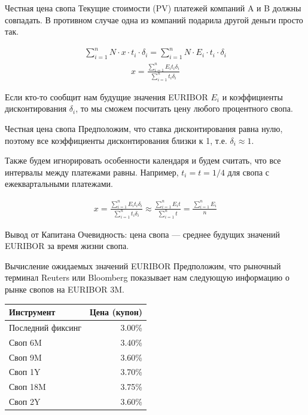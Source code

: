 \documentclass{beamer}
\begin{document}
\begin{frame}{Честная цена свопа}
\justify
Текущие стоимости (PV) платежей компаний A и B должны совпадать. В противном случае одна из компаний подарила другой деньги просто так.

\justify
\begin{align*}
\sum\limits_{i=1}^{n} N \cdot x \cdot t_i \cdot \delta_i 
= \sum\limits_{i=1}^{n} N \cdot E_i \cdot t_i \cdot \delta_i
\end{align*}
\begin{align*}
x = \frac{\sum\limits_{i=1}^{n} E_i t_i \delta_i}{\sum\limits_{i=1}^{n} t_i \delta_i}
\end{align*}

\justify
Если кто-то сообщит нам будущие значения EURIBOR $E_i$ и коэффициенты дисконтирования $\delta_i$, то мы сможем посчитать цену любого процентного свопа.
\end{frame}



\begin{frame}{Честная цена свопа}
\justify
Предположим, что ставка дисконтирования равна нулю, поэтому все коэффициенты дисконтирования близки к 1, т.е. $\delta_i \approx1$.

\justify
Также будем игнорировать особенности календаря и будем считать, что все интервалы между платежами равны. Например, $t_i = t = 1/4$ для свопа с ежеквартальными платежами.

\begin{align*}
x = \frac{\sum\limits_{i=1}^{n} E_i t_i \delta_i}{\sum\limits_{i=1}^{n} t_i \delta_i}
\approx
\frac{\sum\limits_{i=1}^{n} E_i t}{\sum\limits_{i=1}^{n} t}
=
\frac{\sum\limits_{i=1}^{n} E_i}{n}
\end{align*}

\justify
Вывод от Капитана Очевидность: цена свопа --- среднее будущих значений EURIBOR за время жизни свопа.
\end{frame}



\begin{frame}{Вычисление ожидаемых значений EURIBOR}
\justify
Предположим, что рыночный терминал Reuters или Bloomberg показывает нам следующую информацию о рынке свопов на EURIBOR 3M.

\justify
\centering
\begin{tabular}{l|r}
Инструмент        & Цена (купон) \\ \hline
Последний фиксинг & 3.00\% \\
Своп 6M           & 3.40\% \\
Своп 9M           & 3.60\% \\
Своп 1Y           & 3.70\% \\
Своп 18M          & 3.75\% \\
Своп 2Y           & 3.60\%
\end{tabular}

\end{frame}
\end{document}
